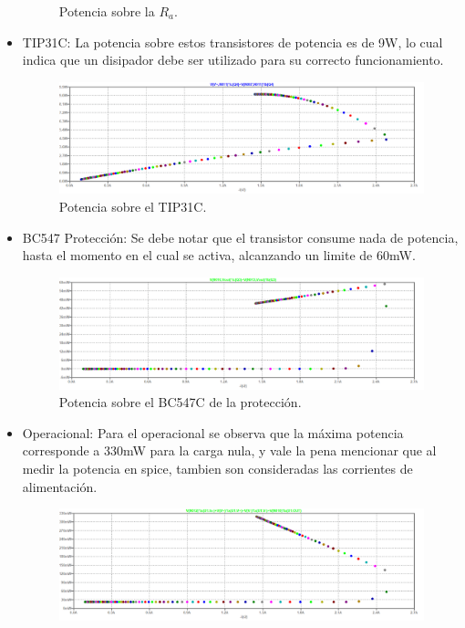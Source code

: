 \begin{itemize}
\begin{figure}[H]
	\caption{Potencia sobre la $R_a$.}
	\label{fig:potra}
\end{figure}
\item TIP31C: La potencia sobre estos transistores de potencia es de 9W, lo cual indica que un disipador debe ser utilizado para su correcto funcionamiento.
\begin{figure}[H]
\centering
	\includegraphics[width=1\textwidth]{ImagenesEjercicio2/pottip31c.png}
	\caption{Potencia sobre el TIP31C.}
	\label{fig:pottip31}
\end{figure}
\item BC547 Protección: Se debe notar que el transistor consume nada de potencia, hasta el momento en el cual se activa, alcanzando un limite de 60mW.
\begin{figure}[H]
\centering
	\includegraphics[width=1\textwidth]{ImagenesEjercicio2/potprot.png}
	\caption{Potencia sobre el BC547C de la protección.}
	\label{fig:potbc547prot}
\end{figure}
\item Operacional: Para el operacional se observa que la máxima potencia corresponde a 330mW para la carga nula, y vale la pena mencionar que al medir la potencia en spice, tambien son consideradas las corrientes de alimentación.
\begin{figure}[H]
\centering
	\includegraphics[width=1\textwidth]{ImagenesEjercicio2/potopamp.png}

\end{figure}
\end{itemize}
